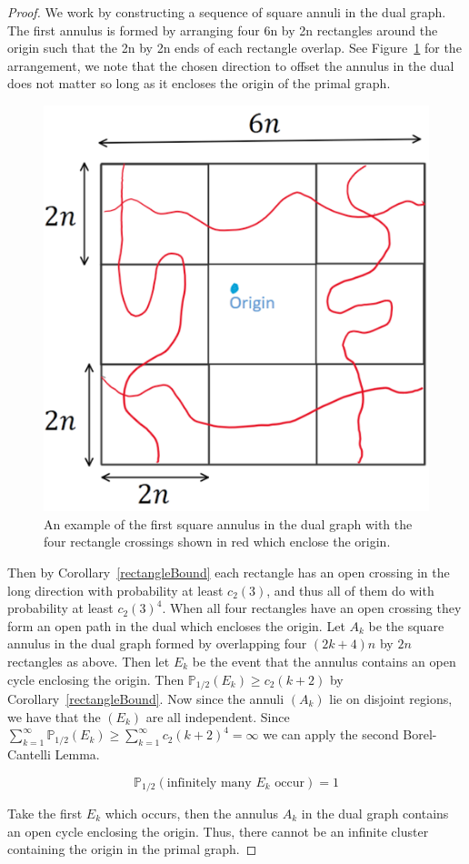 \documentclass[a4paper,11pt]{article}
\theoremstyle{definition}
\newcommand{\prbhlf}{\mathbb{P}_{1/2}}
\begin{document}
\begin{proof}
	We work by constructing a sequence of square annuli in the dual graph. The first annulus is formed by arranging four 6n by 2n rectangles around the origin such that the 2n by 2n ends of each rectangle overlap. See Figure~\ref{fig:squareAnnulus} for the arrangement, we note that the chosen direction to offset the annulus in the dual does not matter so long as it encloses the origin of the primal graph. 
	\begin{figure}
		\centering
		\includegraphics[scale=0.48]{drawings/squareAnnulus.png}
		\caption{An example of the first square annulus in the dual graph with the four rectangle crossings shown in red which enclose the origin.}
		\label{fig:squareAnnulus}

	\end{figure}
	Then by Corollary~\ref{rectangleBound} each rectangle has an open crossing in the long direction with probability at least $c_2(3)$, and thus all of them do with probability at least $c_2(3)^4$. When all four rectangles have an open crossing they form an open path in the dual which encloses the origin. Let $A_k$ be the square annulus in the dual graph formed by overlapping four $(2k+4)n$ by $2n$ rectangles as above. Then let $E_k$ be the event that the annulus contains an open cycle enclosing the origin. Then $\prbhlf(E_k) \geq c_2(k+2)$ by Corollary~\ref{rectangleBound}. Now since the annuli $(A_k)$ lie on disjoint regions, we have that the $(E_k)$ are all independent.
	Since $\sum_{k=1}^{\infty}\prbhlf(E_k) \geq \sum_{k=1}^{\infty}c_2(k+2)^4 = \infty$ we can apply the second Borel-Cantelli Lemma.

	$$\prbhlf(\text{infinitely many }E_k\text{ occur}) = 1$$

	Take the first $E_k$ which occurs, then the annulus $A_k$ in the dual graph contains an open cycle enclosing the origin. Thus, there cannot be an infinite cluster containing the origin in the primal graph.
\end{proof}
\end{document}
